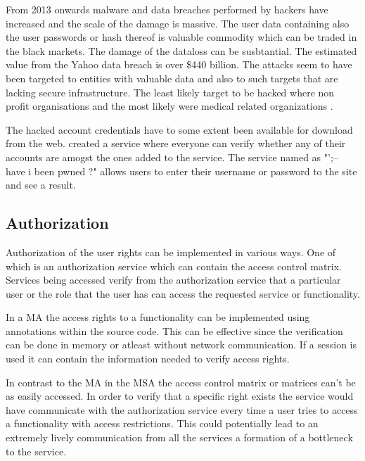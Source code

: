 \begin{sloppypar}
    From 2013 onwards malware and data breaches performed by hackers have 
    increased and the scale of the damage is massive. The user data containing 
    also the user passwords or hash thereof is valuable commodity which can be 
    traded in the black markets. The damage of the dataloss can be susbtantial. 
    The estimated value from the Yahoo data breach is over \$440 billion. The 
    attacks seem to have been targeted to entities with valuable data and 
    also to such targets that are lacking secure infrastructure. The least likely 
    target to be hacked where non profit organisations and the most likely were 
    medical related organizations \citep{breach}.
\end{sloppypar}
\begin{sloppypar}
    The hacked account credentials have to some extent been available for download 
    from the web. \citet{pwned} created a service where everyone can verify 
    whether any of their accounts are amogst the ones added to the service. 
    The service named as "';-- have i been pwned ?" allows users to enter their 
    username or password to the site and see a result.
\end{sloppypar}

\subsection{Authorization}
\begin{sloppypar}
    Authorization of the user rights can be implemented in various ways. One of 
    which is an authorization service which can contain the access control 
    matrix. Services being accessed verify from the authorization service that
    a particular user or the role that the user has can access the requested 
    service or functionality.
\end{sloppypar}

\begin{sloppypar}
    In a MA the access rights to a functionality can be implemented using
    annotations within the source code. This can be effective since the 
    verification can be done in memory or atleast without network communication. 
    If a session is used it can contain the information needed to verify access 
    rights.
\end{sloppypar}

\begin{sloppypar}
    In contrast to the MA in the MSA the access control matrix or matrices can't 
    be as easily accessed. In order to verify that a specific right exists the 
    service would have communicate with the authorization service every time a user
    tries to access a functionality with access restrictions. This could 
    potentially lead to an extremely lively communication from all the services 
    a formation of a bottleneck to the service.
\end{sloppypar}


